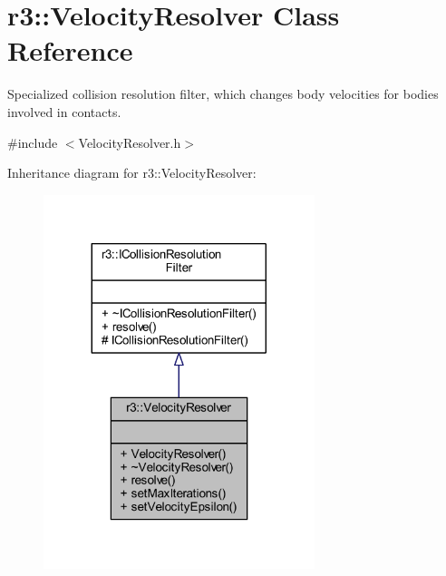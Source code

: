 \hypertarget{classr3_1_1_velocity_resolver}{}\section{r3\+:\+:Velocity\+Resolver Class Reference}
\label{classr3_1_1_velocity_resolver}


Specialized collision resolution filter, which changes body velocities for bodies involved in contacts.  




{\ttfamily \#include $<$Velocity\+Resolver.\+h$>$}



Inheritance diagram for r3\+:\+:Velocity\+Resolver\+:\nopagebreak
\begin{figure}[H]
\begin{center}
\leavevmode
\includegraphics[width=224pt]{classr3_1_1_velocity_resolver__inherit__graph}
\end{center}
\end{figure}


